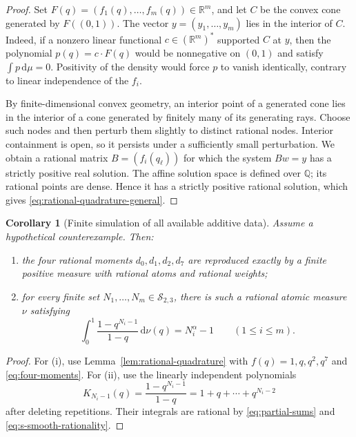 \documentclass[11pt,oneside]{article}
\newtheorem{corollary}[theorem]{Corollary}
\theoremstyle{definition}
\theoremstyle{remark}
\newcommand{\Q}{\mathbb Q}
\newcommand{\R}{\mathbb R}
\newcommand{\Ssmooth}{\mathcal S_{2,3}}
\newcommand{\dd}{\,\mathrm d}
\begin{document}
\begin{proof}
Set $F(q)=(f_1(q),\ldots,f_m(q))\in\R^m$, and let $C$ be the convex cone generated by
$F((0,1))$.  The vector $y=(y_1,\ldots,y_m)$ lies in the interior of $C$.  Indeed, if a
nonzero linear functional $c\in(\R^m)^*$ supported $C$ at $y$, then the polynomial
$p(q)=c\cdot F(q)$ would be nonnegative on $(0,1)$ and satisfy
$\int p\dd\mu=0$.  Positivity of the density would force $p$ to vanish identically, contrary
to linear independence of the $f_i$.

By finite-dimensional convex geometry, an interior point of a generated cone lies in the
interior of a cone generated by finitely many of its generating rays.  Choose such nodes and
then perturb them slightly to distinct rational nodes.  Interior containment is open, so it
persists under a sufficiently small perturbation.  We obtain a rational matrix
$B=(f_i(q_\ell))$ for which the system $Bw=y$ has a strictly positive real solution.  The
affine solution space is defined over $\Q$; its rational points are dense.  Hence it has a
strictly positive rational solution, which gives \eqref{eq:rational-quadrature-general}.
\end{proof}

\begin{corollary}[Finite simulation of all available additive data]\label{cor:finite-simulation}
Assume a hypothetical counterexample.  Then:
\begin{enumerate}[label=\textup{(\roman*)}]
\item the four rational moments $d_0,d_1,d_2,d_7$ are reproduced exactly by a finite positive
      measure with rational atoms and rational weights;
\item for every finite set $N_1,\ldots,N_m\in\Ssmooth$, there is such a rational atomic
      measure $\nu$ satisfying
\[
 \int_0^1\frac{1-q^{N_i-1}}{1-q}\dd\nu(q)=N_i^\alpha-1
 \qquad(1\le i\le m).
\]
\end{enumerate}
\end{corollary}

\begin{proof}
For (i), use Lemma~\ref{lem:rational-quadrature} with
$f(q)=1,q,q^2,q^7$ and \eqref{eq:four-moments}.  For (ii), use the linearly independent
polynomials
\[
 K_{N_i-1}(q)=\frac{1-q^{N_i-1}}{1-q}=1+q+\cdots+q^{N_i-2}
\]
after deleting repetitions.  Their integrals are rational by \eqref{eq:partial-sums} and
\eqref{eq:s-smooth-rationality}.
\end{proof}
\end{document}
